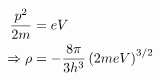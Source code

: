 \begin{parts}
%	
%	
	
	\begin{align*}
		\frac{p^2}{2m} &= eV \\
		\Rightarrow \rho &= -\frac{8\pi}{3h^3} \left(2meV\right)^{3/2}
	\end{align*}
	

\end{parts}

